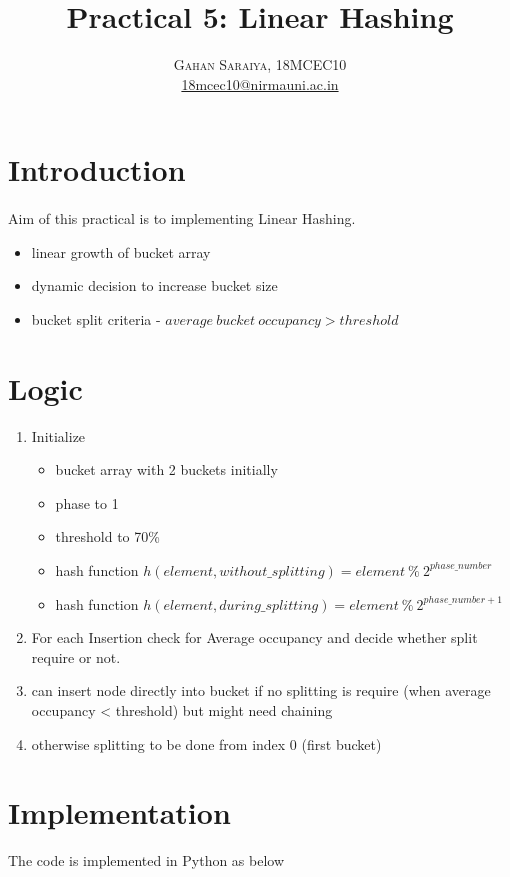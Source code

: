 \documentclass[paper=letter, fontsize=12pt]{article}
\title{\vspace{-15mm}\fontsize{24pt}{10pt}\selectfont\textbf{Practical 5: Linear Hashing}} %
\author{
\large
{\textsc{Gahan Saraiya, 18MCEC10 }}\\[2mm]
\normalsize \href{mailto:18mcec10@nirmauni.ac.in}{18mcec10@nirmauni.ac.in}\\[2mm] %
}
\date{}
\begin{document}
\maketitle %
\thispagestyle{fancy} %


\section{Introduction}
\paragraph{} Aim of this practical is to implementing Linear Hashing.
	\begin{itemize}
		\item linear growth of bucket array
		\item dynamic decision to increase bucket size
		\item bucket split criteria - $average\ bucket\ occupancy > threshold$ 
	\end{itemize}

\section{Logic}
\begin{enumerate}
	\item Initialize 
		\begin{itemize}
			\item bucket array with 2 buckets initially
			\item phase to 1
			\item threshold to 70\%
			\item hash function $h(element, without\_splitting) = element\ \% \ 2^{phase\_number}$
			\item hash function $h(element, during\_splitting) = element\ \% \ 2^{phase\_number+1}$
		\end{itemize}
	\item For each Insertion check for Average occupancy and decide whether split require or not.
	\item can insert node directly into bucket if no splitting is require (when average occupancy < threshold) but might need chaining
	\item otherwise splitting to be done from index 0 (first bucket)
\end{enumerate}

\section{Implementation}
The code is implemented in Python as below
\end{document}
